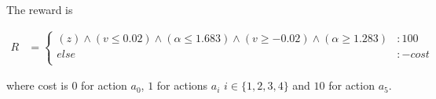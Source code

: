 The reward is

{\tiny
\begin{align*}
R & = \begin{cases}
(z) \wedge (v \leq 0.02) \wedge (\alpha \leq 1.683) \wedge (v \geq -0.02) \wedge (\alpha \geq 1.283) &:100\\
else &: -cost\\
\end{cases}
\end{align*}}

where cost is 0 for action $a_0$, $1$ for actions $a_i$ $i \in \{1,2,3,4\}$ and $10$ for action $a_5$.

